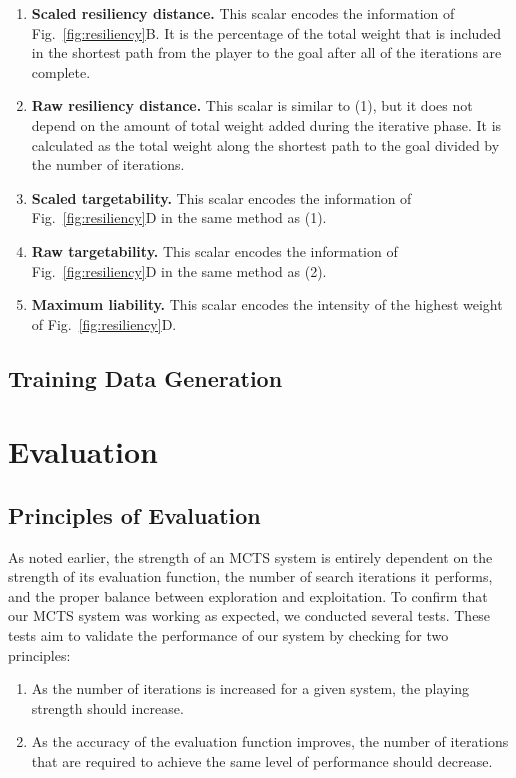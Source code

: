 \documentclass[10pt]{article}
\begin{document}
\begin{enumerate}
    \item \textbf{Scaled resiliency distance.} This scalar encodes the information of Fig.~\ref{fig:resiliency}B. It is the percentage of the total weight that is included in the shortest path from the player to the goal after all of the iterations are complete.
    \item \textbf{Raw resiliency distance.} This scalar is similar to (1), but it does not depend on the amount of total weight added during the iterative phase. It is calculated as the total weight along the shortest path to the goal divided by the number of iterations.
    \item \textbf{Scaled targetability.} This scalar encodes the information of Fig.~\ref{fig:resiliency}D in the same method as (1).
    \item \textbf{Raw targetability.} This scalar encodes the information of Fig.~\ref{fig:resiliency}D in the same method as (2).
    \item \textbf{Maximum liability.} This scalar encodes the intensity of the highest weight of Fig.~\ref{fig:resiliency}D.
\end{enumerate}

\subsection{Training Data Generation}

\section{Evaluation}

\subsection{Principles of Evaluation}

As noted earlier, the strength of an MCTS system is entirely dependent on the strength of its evaluation function, the number of search iterations it performs, and the proper balance between exploration and exploitation. To confirm that our MCTS system was working as expected, we conducted several tests. These tests aim to validate the performance of our system by checking for two principles:

\begin{enumerate}
    \item As the number of iterations is increased for a given system, the playing strength should increase.
    \item As the accuracy of the evaluation function improves, the number of iterations that are required to achieve the same level of performance should decrease.
\end{enumerate}
\end{document}
